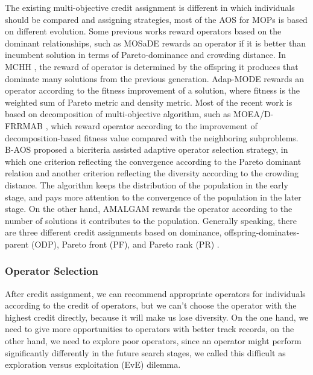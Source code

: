 \documentclass[journal]{IEEEtran}
\begin{document}
The existing multi-objective credit assignment is different in which individuals should be compared and assigning strategies, most of the AOS for MOPs is based on different evolution.
Some previous works reward operators based on the dominant relationships,
such as MOSaDE \cite{huang2007multi} rewards an operator if it is better than incumbent solution in terms of Pareto-dominance and crowding distance.
In MCHH \cite{mcclymont2011markov}, the reward of operator is determined by the offspring it produces that dominate many solutions from the previous generation. Adap-MODE \cite{li2011multi} rewards an operator according to the fitness improvement of a solution, where fitness is the weighted sum of Pareto metric and density metric.
Most of the recent work is based on decomposition of multi-objective algorithm, such as MOEA/D-FRRMAB \cite{frrmab}, which reward operator according to the improvement of decomposition-based fitness value compared with the neighboring subproblems.
B-AOS \cite{lin2021decomposition} proposed a bicriteria assisted adaptive operator selection strategy, in which one criterion reflecting the convergence according to the Pareto dominant relation and another criterion reflecting the diversity according to the crowding distance.
The algorithm keeps the distribution of the population in the early stage, and pays more attention to the convergence of the population in the later stage.
On the other hand, AMALGAM \cite{vrugt2007improved} rewards the operator according to the number of solutions it contributes to the population.
Generally speaking, there are three different credit assignments based on dominance, offspring-dominates-parent (ODP), Pareto front (PF), and Pareto rank (PR) \cite{hitomi2015effect}.

\subsubsection{Operator Selection}
After credit assignment, we can recommend appropriate operators for individuals according to the credit of operators, but we can't choose the operator with the highest credit directly, because it will make us lose diversity.
On the one hand, we need to give more opportunities to operators with better track records, on the other hand, we need to explore poor operators, since an operator might perform significantly differently in the future search stages, we called this difficult as exploration versus exploitation (EvE) dilemma.
\end{document}
